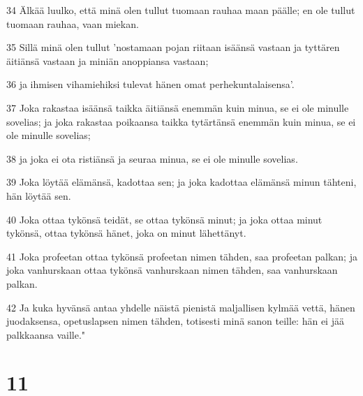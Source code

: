 \par 34 Älkää luulko, että minä olen tullut tuomaan rauhaa maan päälle; en ole tullut tuomaan rauhaa, vaan miekan.
\par 35 Sillä minä olen tullut 'nostamaan pojan riitaan isäänsä vastaan ja tyttären äitiänsä vastaan ja miniän anoppiansa vastaan;
\par 36 ja ihmisen vihamiehiksi tulevat hänen omat perhekuntalaisensa'.
\par 37 Joka rakastaa isäänsä taikka äitiänsä enemmän kuin minua, se ei ole minulle sovelias; ja joka rakastaa poikaansa taikka tytärtänsä enemmän kuin minua, se ei ole minulle sovelias;
\par 38 ja joka ei ota ristiänsä ja seuraa minua, se ei ole minulle sovelias.
\par 39 Joka löytää elämänsä, kadottaa sen; ja joka kadottaa elämänsä minun tähteni, hän löytää sen.
\par 40 Joka ottaa tykönsä teidät, se ottaa tykönsä minut; ja joka ottaa minut tykönsä, ottaa tykönsä hänet, joka on minut lähettänyt.
\par 41 Joka profeetan ottaa tykönsä profeetan nimen tähden, saa profeetan palkan; ja joka vanhurskaan ottaa tykönsä vanhurskaan nimen tähden, saa vanhurskaan palkan.
\par 42 Ja kuka hyvänsä antaa yhdelle näistä pienistä maljallisen kylmää vettä, hänen juodaksensa, opetuslapsen nimen tähden, totisesti minä sanon teille: hän ei jää palkkaansa vaille."

\chapter{11}

